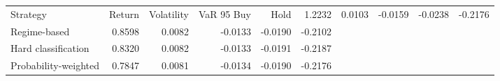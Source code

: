 \begin{tabular}{lrrrrr}
\toprule
Strategy & Return & Volatility & VaR 95%
\midrule
Buy & Hold & 1.2232 & 0.0103 & -0.0159 & -0.0238 & -0.2176 \\
Regime-based & 0.8598 & 0.0082 & -0.0133 & -0.0190 & -0.2102 \\
Hard classification & 0.8320 & 0.0082 & -0.0133 & -0.0191 & -0.2187 \\
Probability-weighted & 0.7847 & 0.0081 & -0.0134 & -0.0190 & -0.2176 \\
\bottomrule
\end{tabular}
